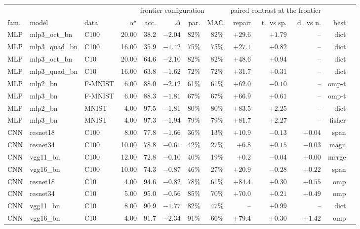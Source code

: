 \begin{tabular}{lllrrrrrrrrrl}
\toprule
& & & \multicolumn{5}{c}{frontier configuration} & \multicolumn{3}{c}{paired contrast at the frontier} & \\
\cmidrule(lr){4-8}\cmidrule(lr){9-11}
fam. & model & data & $\alpha^\star$ & acc. & $\Delta$ & par. & MAC & repair & t.\ vs sp. & d.\ vs n. & best\\
\midrule
MLP & mlp3\_oct\_bn & C100 & 20.00 & 38.2 & $-2.04$ & 82\% & 82\% & $+29.6$ & $+1.79$ & -- & dict\\
MLP & mlp3\_quad\_bn & C100 & 16.00 & 35.9 & $-1.42$ & 75\% & 75\% & $+27.1$ & $+0.82$ & -- & dict\\
MLP & mlp3\_oct\_bn & C10 & 20.00 & 64.6 & $-2.10$ & 82\% & 82\% & $+48.6$ & $+0.94$ & -- & dict\\
MLP & mlp3\_quad\_bn & C10 & 16.00 & 63.8 & $-1.62$ & 72\% & 72\% & $+31.7$ & $+0.31$ & -- & dict\\
MLP & mlp2\_bn & F-MNIST & 6.00 & 88.0 & $-2.12$ & 61\% & 61\% & $+62.0$ & $-0.10$ & -- & omp-t\\
MLP & mlp3\_bn & F-MNIST & 6.00 & 88.3 & $-1.81$ & 67\% & 67\% & $+66.9$ & $+0.61$ & -- & omp-t\\
MLP & mlp2\_bn & MNIST & 4.00 & 97.5 & $-1.81$ & 80\% & 80\% & $+83.5$ & $+2.25$ & -- & dict\\
MLP & mlp3\_bn & MNIST & 4.00 & 97.3 & $-1.94$ & 79\% & 79\% & $+81.7$ & $+2.27$ & -- & fisher\\
CNN & resnet18 & C100 & 8.00 & 77.8 & $-1.66$ & 36\% & 13\% & $+10.9$ & $-0.13$ & $+0.04$ & span\\
CNN & resnet34 & C100 & 10.00 & 78.8 & $-0.61$ & 42\% & 27\% & $+6.8$ & $+0.15$ & $-0.03$ & magn\\
CNN & vgg11\_bn & C100 & 12.00 & 72.8 & $-0.10$ & 40\% & 19\% & $+0.2$ & $-0.04$ & $+0.00$ & merge\\
CNN & vgg16\_bn & C100 & 10.00 & 74.3 & $-0.87$ & 46\% & 27\% & $+20.9$ & $-0.28$ & $+0.22$ & span\\
CNN & resnet18 & C10 & 4.00 & 94.6 & $-0.82$ & 78\% & 61\% & $+84.4$ & $+0.30$ & $+0.55$ & omp\\
CNN & resnet34 & C10 & 5.00 & 95.0 & $-0.56$ & 85\% & 70\% & $+70.0$ & $+0.21$ & $+0.49$ & omp\\
CNN & vgg11\_bn & C10 & 8.00 & 90.9 & $-1.77$ & 82\% & 47\% & -- & $+0.99$ & -- & dict\\
CNN & vgg16\_bn & C10 & 4.00 & 91.7 & $-2.34$ & 91\% & 66\% & $+79.4$ & $+0.30$ & $+1.42$ & omp\\

\end{tabular}
